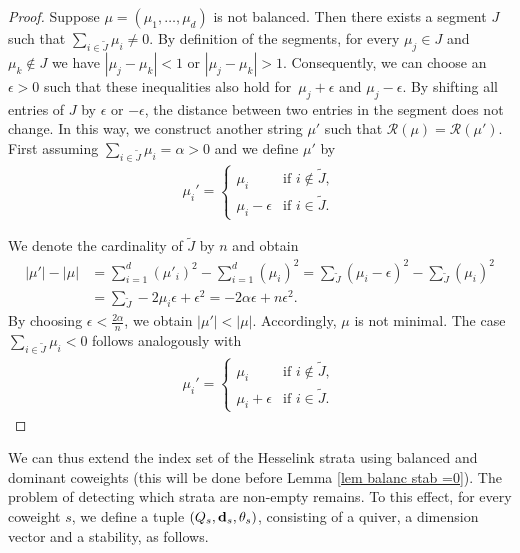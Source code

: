 \documentclass[10pt,a4paper]{amsart}
\newcommand{\R}{\mathcal{R}}
\numberwithin{equation}{section}
\theoremstyle{definition}
\begin{document}
\begin{proof}
Suppose $\mu = (\mu_1, \dots, \mu_d)$ is not balanced. Then there exists a segment $J$ such that $\sum_{i \in \tilde{J}} \mu_i \neq 0$. By definition of the segments, for every $\mu_j \in J$ and $\mu_k \notin J$ we have $|\mu_j - \mu_k| < 1$ or $|\mu_j - \mu_k| > 1$. Consequently, we can choose an $ \epsilon >0$ such that these inequalities also hold for~${\mu_j + \epsilon}$ and $\mu_j - \epsilon$. By shifting all entries of $J$ by $\epsilon$ or $-\epsilon$, the distance between two entries in the segment does not change. In this way, we construct another string $\mu'$ such that $\R(\mu) = \R(\mu')$. First assuming $\sum_{i \in \tilde{J}} \mu_i = \alpha > 0$ and we define $\mu'$ by
\begin{gather*}
 \mu_i' = \begin{cases}
 \mu_i & \text{if } i \notin \tilde{J} ,\\
 \mu_i - \epsilon & \text{if } i \in \tilde{J} .
 \end{cases}
\end{gather*}

We denote the cardinality of $\tilde{J}$ by $n$ and obtain
\begin{align*}
|\mu'|- |\mu|&= \sum_{i=1}^d (\mu'_i)^2 - \sum_{i=1}^d (\mu_i)^2 = \sum_{\tilde{J}} (\mu_i - \epsilon)^2 - \sum_{\tilde{J}} (\mu_i)^2 \\
&= \sum_{\tilde{J}} -2\mu_i\epsilon +\epsilon^2 = -2\alpha\epsilon + n \epsilon^2 .
\end{align*}
By choosing $\epsilon < \frac{2\alpha}{n}$, we obtain $|\mu'| < |\mu|$. Accordingly, $\mu$ is not minimal. The case $\sum_{i \in \tilde{J}} \mu_i < 0$ follows analogously with
\begin{gather*}
 \mu_i' = \begin{cases}
 \mu_i & \text{if } i \notin \tilde{J}, \\
 \mu_i + \epsilon & \text{if } i \in \tilde{J} .
 \end{cases}\tag*{\qed}
\end{gather*}\renewcommand{\qed}{}
\end{proof}

We can thus extend the index set of the Hesselink strata using balanced and dominant coweights (this will be done before Lemma \ref{lem balanc stab =0}). The problem of detecting which strata are non-empty remains. To this effect, for every coweight $s$, we define a tuple $(Q_s,{\bf d}_s,\theta_s)$, consisting of a quiver, a dimension vector and a stability, as follows.
\end{document}

